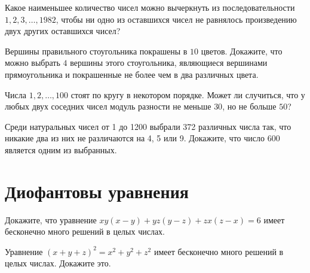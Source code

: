 \documentclass[12pt]{article}
\begin{document}
\begin{task} Какое наименьшее количество чисел можно вычеркнуть из последовательности $1, 2, 3, \dots, 1982$, чтобы ни одно из оставшихся чисел не равнялось произведению двух других оставшихся чисел?
\end{task}

\begin{task} Вершины правильного стоугольника покрашены в $10$ цветов. Докажите, что можно выбрать $4$ вершины этого стоугольника, являющиеся вершинами прямоугольника и покрашенные не более чем в два различных цвета.
\end{task}

\begin{task} Числа $1, 2, \dots, 100$ стоят по кругу в некотором порядке. Может ли случиться, что у любых двух соседних чисел модуль разности не меньше $30$, но не больше $50$?
\end{task}

\begin{task}
Среди натуральных чисел от 1 до 1200 выбрали 372 различных числа так, что никакие два из них не различаются на 4, 5 или 9. Докажите, что число 600 является одним из выбранных. 
\end{task}


\section*{Диофантовы уравнения}

\begin{task}
Докажите, что уравнение $xy(x-y)+yz(y-z)+zx(z-x) = 6 $ имеет бесконечно много решений в целых числах.
\end{task}

\begin{task}
Уравнение $(x + y + z)^{2} = x^{2} + y^{2} + z^{2}$ имеет бесконечно много решений в целых числах. Докажите это.
\end{task}
\end{document}
